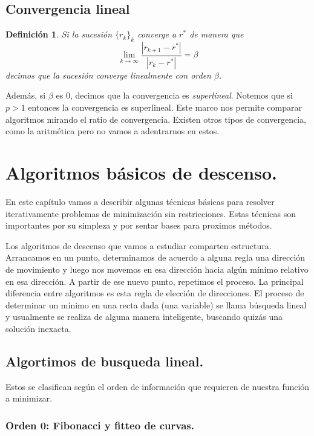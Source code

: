 \documentclass[11pt]{article}
\theoremstyle{ejstyle}
\theoremstyle{ejstyle}
\newtheorem{definicion}{Definición}
\theoremstyle{ejstyle}
\theoremstyle{ejstyle}
\theoremstyle{ejstyle}
\theoremstyle{ejstyle}
\theoremstyle{ejstyle}
\begin{document}
	\subsection{Convergencia lineal}
	
	\begin{definicion}
		Si la sucesión $\{r_k\}_k$ converge a $r^*$ de manera que
		$$
		\lim_{k\to \infty} \frac{|r_{k+1} - r^{*}|}{|r_k - r^{*}|} = \beta 
		$$
		decimos que la sucesión converge linealmente con orden $\beta$.
	\end{definicion}
	
	Además, si $\beta$ es 0, decimos que la convergencia es \emph{superlineal}. Notemos que si $p > 1$ entonces la convergencia es superlineal. Este marco nos permite comparar algoritmos mirando el ratio de convergencia. Existen otros tipos de convergencia, como la aritmética pero no vamos a adentrarnos en estos.
	
	\section{Algoritmos básicos de descenso.}
	
	En este capítulo vamos a describir algunas técnicas básicas para resolver iterativamente problemas de minimización sin restricciones. Estas técnicas son importantes por su simpleza y por sentar bases para proximos métodos.
	
	Los algoritmos de descenso que vamos a estudiar comparten estructura. Arrancamos en un punto, determinamos de acuerdo a alguna regla una dirección 
	de movimiento y luego nos movemos en esa dirección hacia algún mínimo relativo en esa dirección. A partir de ese nuevo punto, repetimos el proceso.
	La principal diferencia entre algoritmos es esta regla de elección de direcciones. El proceso de determinar un mínimo en una recta dada (una variable) se llama búsqueda lineal y usualmente se realiza de alguna manera inteligente, buscando quizás una solución inexacta.
	
	\subsection{Algortimos de busqueda lineal.}
	
	Estos se clasifican según el orden de información que requieren de nuestra función a minimizar.
	
	\subsubsection{Orden 0: Fibonacci y fitteo de curvas.}
	
\end{document}
